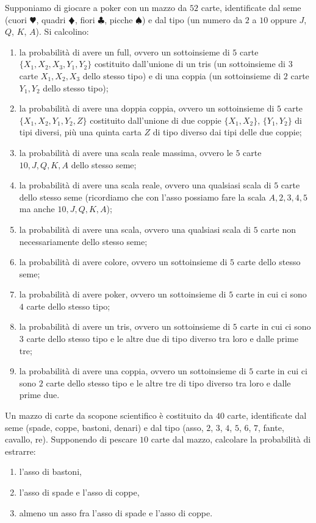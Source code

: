 Supponiamo di giocare a poker con un mazzo da $52$ carte, identificate dal seme (cuori $\varheartsuit $, quadri $\vardiamondsuit $, fiori $\clubsuit $, picche $\spadesuit $) e dal tipo (un numero da $2$ a $10$ oppure $J$, $Q$, $K$, $A$). Si calcolino:
\begin{enumerate}
\item la probabilità di avere un full, ovvero un sottoinsieme di $5$ carte $\{X_{1} ,X_{2} ,X_{3} ,Y_{1} ,Y_{2}\}$ costituito dall'unione di un tris (un sottoinsieme di $3$ carte $X_{1} ,X_{2} ,X_{3}$ dello stesso tipo) e di una coppia (un sottoinsieme di $2$ carte $Y_{1} ,Y_{2}$ dello stesso tipo);
\item la probabilità di avere una doppia coppia, ovvero un sottoinsieme di $5$ carte $\{X_{1} ,X_{2} ,Y_{1} ,Y_{2} ,Z\}$ costituito dall'unione di due coppie $\{X_{1} ,X_{2}\}$, $\{Y_{1} ,Y_{2}\}$ di tipi diversi, più una quinta carta $Z$ di tipo diverso dai tipi delle due coppie;
\item la probabilità di avere una scala reale massima, ovvero le $5$ carte $10,J,Q,K,A$ dello stesso seme;
\item la probabilità di avere una scala reale, ovvero una qualsiasi scala di $5$ carte dello stesso seme (ricordiamo che con l'asso possiamo fare la scala $A,2,3,4,5$ ma anche $10,J,Q,K,A$);
\item la probabilità di avere una scala, ovvero una qualsiasi scala di $5$ carte non necessariamente dello stesso seme;
\item la probabilità di avere colore, ovvero un sottoinsieme di $5$ carte dello stesso seme;
\item la probabilità di avere poker, ovvero un sottoinsieme di $5$ carte in cui ci sono $4$ carte dello stesso tipo;
\item la probabilità di avere un tris, ovvero un sottoinsieme di $5$ carte in cui ci sono $3$ carte dello stesso tipo e le altre due di tipo diverso tra loro e dalle prime tre;
\item la probabilità di avere una coppia, ovvero un sottoinsieme di $5$ carte in cui ci sono $2$ carte dello stesso tipo e le altre tre di tipo diverso tra loro e dalle prime due.
\end{enumerate}
\Esercizio{}

Un mazzo di carte da scopone scientifico è costituito da $40$ carte, identificate dal seme (spade, coppe, bastoni, denari) e dal tipo (asso, $2$, $3$, $4$, $5$, $6$, $7$, fante, cavallo, re). Supponendo di pescare $10$ carte dal mazzo, calcolare la probabilità di estrarre:
\begin{enumerate}
\item l'asso di bastoni,
\item l'asso di spade e l'asso di coppe,
\item almeno un asso fra l'asso di spade e l'asso di coppe.
\end{enumerate}
\Esercizio{}

